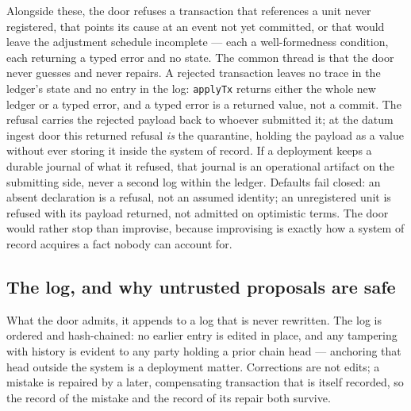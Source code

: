 Alongside these, the door refuses a transaction that references a unit never
registered, that points its cause at an event not yet committed, or that would
leave the adjustment schedule incomplete --- each a well-formedness condition,
each returning a typed error and no state. The common thread is that the door
never guesses and never repairs. A rejected transaction leaves no trace in the
ledger's state and no entry in the log: \texttt{applyTx} returns either the whole
new ledger or a typed error, and a typed error is a returned value, not a commit.
The refusal carries the rejected payload back to whoever submitted it; at the datum
ingest door this returned refusal \emph{is} the quarantine, holding the payload as
a value without ever storing it inside the system of record. If a deployment keeps
a durable journal of what it refused, that journal is an operational artifact on
the submitting side, never a second log within the ledger. Defaults fail closed:
an absent declaration is a refusal, not an assumed identity; an unregistered unit
is refused with its payload returned, not admitted on optimistic terms. The door would rather stop than improvise, because improvising
is exactly how a system of record acquires a fact nobody can account for.

\subsection{The log, and why untrusted proposals are safe}

What the door admits, it appends to a log that is never rewritten. The log is
ordered and hash-chained: no earlier entry is edited in place, and any tampering
with history is evident to any party holding a prior chain head --- anchoring that
head outside the system is a deployment matter. Corrections are not edits; a mistake is
repaired by a later, compensating transaction that is itself recorded, so the
record of the mistake and the record of its repair both survive.

